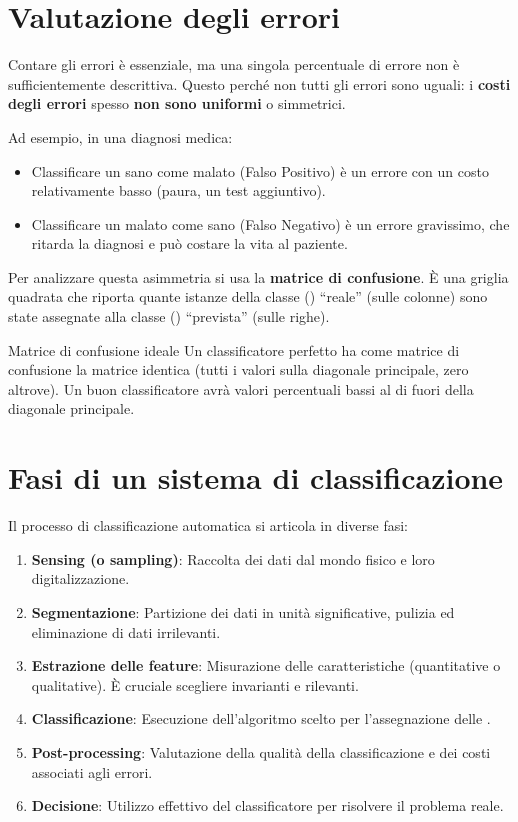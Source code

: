\section{Valutazione degli errori}

Contare gli errori è essenziale, ma una singola percentuale
di errore non è sufficientemente descrittiva. Questo perché
non tutti gli errori sono uguali: i \textbf{costi degli errori}
spesso \textbf{non sono uniformi} o simmetrici.

Ad esempio, in una diagnosi medica:
\begin{itemize}
    \item Classificare un sano come malato (Falso Positivo)
    è un errore con un costo relativamente basso (paura, un
    test aggiuntivo).
    \item Classificare un malato come sano (Falso Negativo)
    è un errore gravissimo, che ritarda la diagnosi e
    può costare la vita al paziente.
\end{itemize}

Per analizzare questa asimmetria si usa la
\textbf{matrice di confusione}. È una griglia quadrata
che riporta quante istanze della classe () ``reale'' (sulle colonne)
sono state assegnate alla classe () ``prevista'' (sulle righe).

\begin{nota}{Matrice di confusione ideale}{}
    Un classificatore perfetto ha come matrice di confusione la
    matrice identica (tutti i valori sulla diagonale principale,
    zero altrove). Un buon classificatore avrà valori
    percentuali bassi al di fuori della diagonale principale.
\end{nota}
\section{Fasi di un sistema di classificazione}

Il processo di classificazione automatica si articola in
diverse fasi:
\begin{enumerate}
    \item \textbf{Sensing (o sampling)}: Raccolta dei dati dal
    mondo fisico e loro digitalizzazione.
    \item \textbf{Segmentazione}: Partizione dei dati in unità
    significative, pulizia ed eliminazione di dati irrilevanti.
    \item \textbf{Estrazione delle feature}: Misurazione delle
    caratteristiche (quantitative o qualitative). È cruciale
    scegliere  invarianti e rilevanti.
    \item \textbf{Classificazione}: Esecuzione dell'algoritmo
    scelto per l'assegnazione delle .
    \item \textbf{Post-processing}: Valutazione della qualità
    della classificazione e dei costi associati agli errori.
    \item \textbf{Decisione}: Utilizzo effettivo del
    classificatore per risolvere il problema reale.
\end{enumerate}

